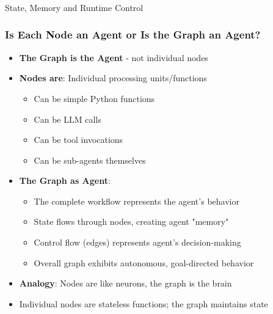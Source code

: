 \begin{frame}[fragile]\frametitle{}
\begin{center}
{\Large State, Memory and Runtime Control}
\end{center}
\end{frame}
\begin{frame}[fragile]\frametitle{Is Each Node an Agent or Is the Graph an Agent?}
      \begin{itemize}
        \item \textbf{The Graph is the Agent} - not individual nodes
        \item \textbf{Nodes are}: Individual processing units/functions
        \begin{itemize}
            \item Can be simple Python functions
            \item Can be LLM calls
            \item Can be tool invocations
            \item Can be sub-agents themselves
        \end{itemize}
        \item \textbf{The Graph as Agent}:
        \begin{itemize}
            \item The complete workflow represents the agent's behavior
            \item State flows through nodes, creating agent "memory"
            \item Control flow (edges) represents agent's decision-making
            \item Overall graph exhibits autonomous, goal-directed behavior
        \end{itemize}
        \item \textbf{Analogy}: Nodes are like neurons, the graph is the brain
        \item Individual nodes are stateless functions; the graph maintains state
      \end{itemize}
\end{frame}

